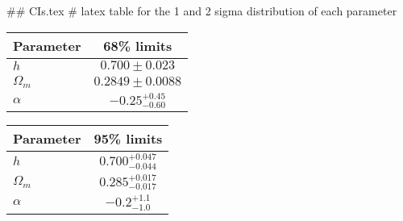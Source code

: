 ## CIs.tex
# latex table for the 1 and 2 sigma distribution of each parameter

\begin{tabular} { l  c}
 Parameter &  68\% limits\\
\hline
{\boldmath$h              $} & $0.700\pm 0.023            $\\
{\boldmath$\Omega_m       $} & $0.2849\pm 0.0088          $\\
{\boldmath$\alpha         $} & $-0.25^{+0.45}_{-0.60}     $\\
\hline
\end{tabular}

\begin{tabular} { l  c}
 Parameter &  95\% limits\\
\hline
{\boldmath$h              $} & $0.700^{+0.047}_{-0.044}   $\\
{\boldmath$\Omega_m       $} & $0.285^{+0.017}_{-0.017}   $\\
{\boldmath$\alpha         $} & $-0.2^{+1.1}_{-1.0}        $\\
\hline
\end{tabular}
